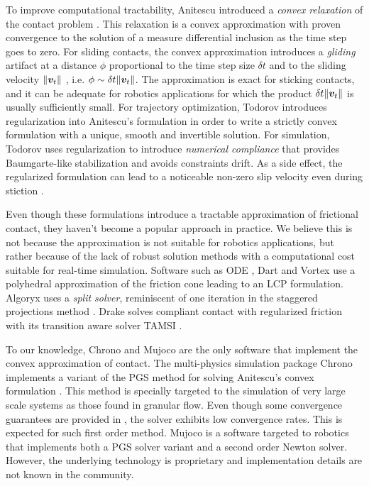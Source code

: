 To improve computational tractability, Anitescu introduced a \textit{convex
relaxation} of the contact problem \cite{bib:anitescu2006}. This relaxation is a
convex approximation with proven convergence to the solution of a measure
differential inclusion as the time step goes to zero. For sliding contacts,
the convex approximation introduces a \emph{gliding} artifact at a distance $\phi$
proportional to the time step size $\delta t$ and to the sliding velocity
$\Vert{\bm{v}}_t\Vert$ \cite{bib:mazhar2014}, i.e. $\phi\sim \delta
t\Vert{\bm{v}}_t\Vert$. The approximation is exact for sticking contacts,
and it can be adequate for robotics applications for which the product $\delta
t\Vert{\bm{v}}_t\Vert$ is usually sufficiently small. For trajectory optimization,
Todorov \cite{bib:todorov2011} introduces regularization into Anitescu's
formulation in order to write a strictly convex formulation with a unique,
smooth and invertible solution. For simulation, Todorov \cite{bib:todorov2014}
uses regularization to introduce \emph{numerical compliance} that provides
Baumgarte-like stabilization and avoids constraints drift. As a side effect, the
regularized formulation can lead to a noticeable non-zero slip velocity even
during stiction \cite{bib:simbenchmark}.

Even though these formulations introduce a tractable approximation of frictional
contact, they haven't become a popular approach in practice. We
believe this is not because the approximation is not suitable for robotics
applications, but rather because of the lack of robust solution methods with a
computational cost suitable for real-time simulation. Software such as ODE
\cite{bib:ode}, Dart \cite{bib:dart} and Vortex \cite{bib:vortex} use a
polyhedral approximation of the friction cone leading to an LCP formulation.
Algoryx \cite{bib:algoryx} uses a \emph{split solver}, reminiscent of one
iteration in the staggered projections method \cite{bib:Kaufman2008}. Drake
\cite{bib:drake} solves compliant contact with regularized friction with its
transition aware solver TAMSI \cite{bib:castro2020}. 

To our knowledge, Chrono \cite{bib:hrono2016} and Mujoco
\cite{bib:mujoco} are the only software that implement the convex approximation
of contact. The multi-physics simulation package Chrono implements a variant of
the PGS method for solving Anitescu's convex formulation \cite{bib:tasora2011}.
This method is specially targeted to the simulation of very large scale systems
as those found in granular flow. Even though some convergence guarantees are
provided in \cite{bib:anitescu2010}, the solver exhibits low convergence rates.
This is expected for such first order method. Mujoco is a software targeted to
robotics that implements both a PGS solver variant \cite{bib:todorov2014} and a
second order Newton solver. However, the underlying technology is proprietary and
implementation details are not known in the community.

